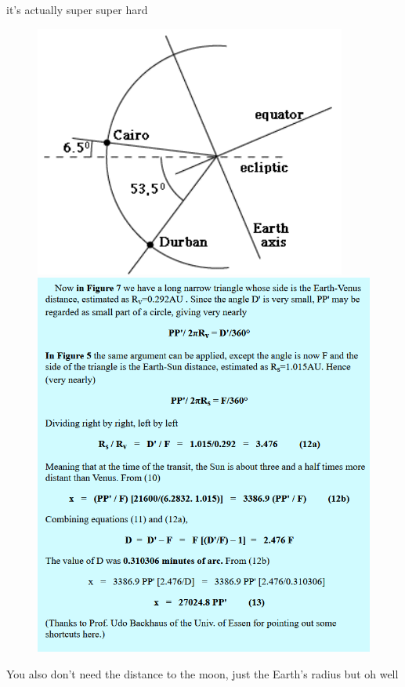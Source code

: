 \documentclass[12pt]{beamer}
\begin{document}
        \begin{frame}
            it's actually super super hard
            \begin{figure}
                \includegraphics[scale=0.5]{halley3.png}
                \includegraphics[scale=0.3]{halley4.png}
            \end{figure}
            You also don't need the distance to the moon, just the Earth's radius but oh well
        \end{frame}
\end{document}
